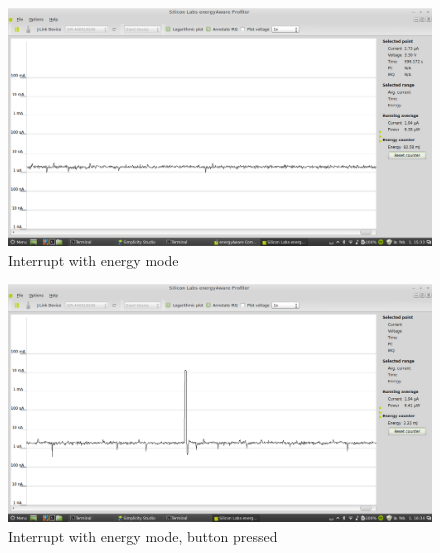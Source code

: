 	\begin{center}
	\begin{figure}
	
	\includegraphics[width=\textwidth]{fig/interruptsAndEnergy.png}	
	\caption{Interrupt with energy mode}
	\end{figure}
	
	\begin{figure}
	\includegraphics[width=\textwidth]{fig/interruptAndButton.png}	
	\caption{Interrupt with energy mode, button pressed }	
	\end{figure}

	\end{center}